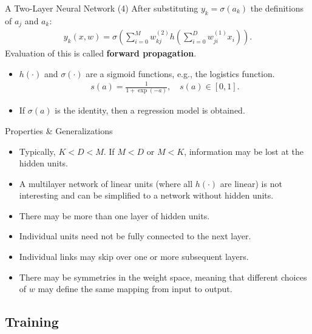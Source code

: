 \documentclass[10pt, hyperref={colorlinks = true,linkcolor = blue}]{beamer}
\begin{document}
{{\begin{frame}{A Two-Layer Neural Network (4)}
After substituting $y_k = \sigma(a_k)$ the definitions of $a_j$ and $a_k:$
\begin{align*}
y_k( x, w) = \sigma\left(\sum_{i=0}^{M} w_{kj}^{(2)} h\left(\sum_{i=0}^{D} w_{ji}^{(1)} x_i \right) \right).
\end{align*}
Evaluation of this is called \textbf{forward propagation}.
\begin{itemize}
\item $h(\cdot)$ and $\sigma(\cdot)$ are a sigmoid functions, e.g.,  the logistics function.
\begin{align*}
s(a) = \frac{1}{1+ \exp(-a)}, \quad s(a) \in [0,1].
\end{align*}
\item If $\sigma(a)$ is the identity, then a regression model is obtained.
\end{itemize}
\end{frame}



\begin{frame}{Properties \& Generalizations}
\begin{itemize}
    \item Typically, \( K < D < M \). If \( M < D \) or \( M < K \), information may be lost at the hidden units.
    \item A multilayer network of linear units (where all \( h(\cdot) \) are linear) is not interesting and can be simplified to a network without hidden units.
    \item There may be more than one layer of hidden units.
    \item Individual units need not be fully connected to the next layer.
    \item Individual links may skip over one or more subsequent layers.
    \item There may be symmetries in the weight space, meaning that different choices of \( w \) may define the same mapping from input to output.
\end{itemize}
\end{frame}

{\subsection{Training}

}}}
\end{document}
